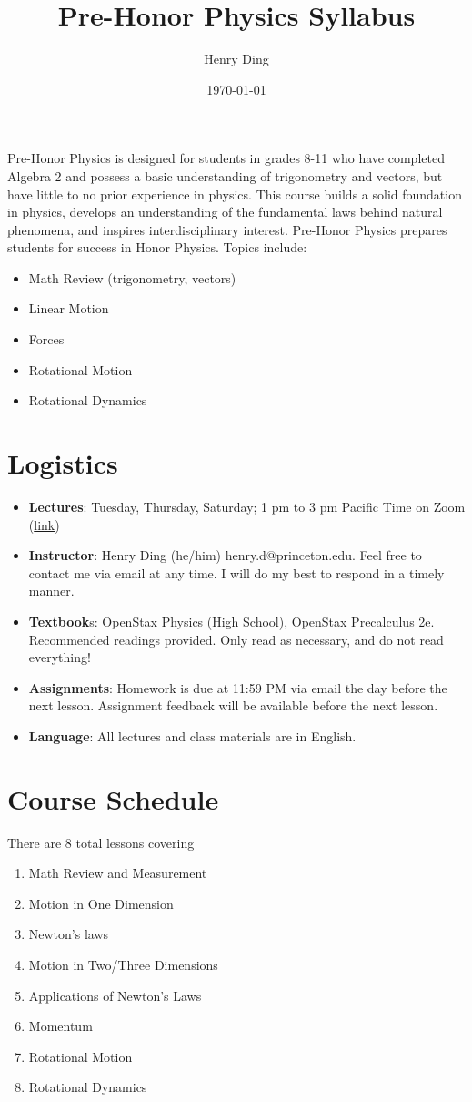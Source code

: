 \documentclass[12pt]{article}
\title{Pre-Honor Physics Syllabus}
\author{Henry Ding}
\date{\today}
\begin{document}
\maketitle
Pre-Honor Physics is designed for students in grades 8-11 who have completed Algebra 2 and possess a basic understanding of trigonometry and vectors, but have little to no prior experience in physics. This course builds a solid foundation in physics, develops an understanding of the fundamental laws behind natural phenomena, and inspires interdisciplinary interest. Pre-Honor Physics prepares students for success in Honor Physics. Topics include:
\begin{itemize}
	\item Math Review (trigonometry, vectors)
	\item Linear Motion
	\item Forces
	\item Rotational Motion
	\item Rotational Dynamics
\end{itemize}

\section*{Logistics}
\begin{itemize}
	\item \textbf{Lectures}: Tuesday, Thursday, Saturday; 1 pm to 3 pm Pacific Time on Zoom (\href{https://us06web.zoom.us/j/84225321342}{link})
	\item \textbf{Instructor}: Henry Ding (he/him) henry.d@princeton.edu. Feel free to contact me via email at any time. I will do my best to respond in a timely manner.
	\item \textbf{Textbook}s: \href{https://openstax.org/details/books/physics}{OpenStax Physics (High School)}, \href{https://openstax.org/details/books/precalculus-2e}{OpenStax Precalculus 2e}. Recommended readings provided. Only read as necessary, and do not read everything!
	\item \textbf{Assignments}: Homework is due at 11:59 PM via email the day before the next lesson. Assignment feedback will be available before the next lesson.
	\item \textbf{Language}: All lectures and class materials are in English.
\end{itemize}

\section*{Course Schedule}
There are 8 total lessons covering
\begin{enumerate}
	\item Math Review and Measurement
	\item Motion in One Dimension
	\item Newton's laws
	\item Motion in Two/Three Dimensions
	\item Applications of Newton's Laws
	\item Momentum
	\item Rotational Motion
	\item Rotational Dynamics
\end{enumerate}
\end{document}
